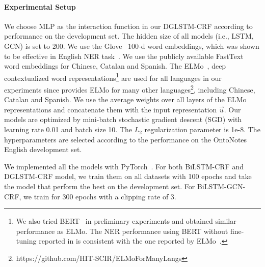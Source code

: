 \paragraph{Experimental Setup}
We choose MLP as the interaction function in our DGLSTM-CRF according to performance on the development set. 
The hidden size of all models (i.e., LSTM, GCN) is set to 200. 
We use the Glove~\cite{pennington2014glove} 100-d word embeddings, which was shown to be effective in English NER task~\cite{ma2016end,peters2018deep}. 
We use the publicly available FastText~\cite{grave2018learning} word embeddings for Chinese, Catalan and Spanish. 
The ELMo~\cite{peters2018deep}, deep contextualized word representations\footnote{We also tried BERT~\cite{devlin2019bert} in preliminary experiments and obtained similar performance as ELMo. The NER performance using BERT without fine-tuning reported in \citet{peters2019tune} is consistent with the one reported by ELMo~\cite{peters2018deep}.} are used for all languages in our experiments since \citet{che2018towards} provides ELMo for many other languages\footnote{https://github.com/HIT-SCIR/ELMoForManyLangs}, including Chinese, Catalan and Spanish. 
We use the average weights over all layers of the ELMo representations and concatenate them with the input representation $\vec{u}$. 
Our models are optimized by mini-batch stochastic gradient descent (SGD) with learning rate 0.01 and batch size 10.
The $L_2$ regularization parameter is 1e-8. 
The hyperparameters are selected according to the performance on the OntoNotes English development set. 

We implemented all the models with PyTorch~\cite{paszke2017automatic}.
For both BiLSTM-CRF and DGLSTM-CRF model, we train them on all datasets with 100 epochs and take the model that perform the best on the development set. 
For BiLSTM-GCN-CRF, we train for 300 epochs with a clipping rate of 3.


